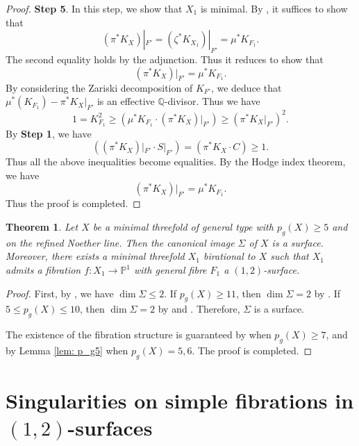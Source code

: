 \documentclass[a4paper,11pt]{amsart}
\newcommand{\PP}{\ensuremath{\mathbb{P}}}
\newcommand{\QQ}{\ensuremath{\mathbb{Q}}}
\newtheorem{thm}{Theorem}[section]
\theoremstyle{definition}
\theoremstyle{remark}
\numberwithin{equation}{section}
\begin{document}
\begin{proof}
	\textbf{Step 5}. In this step, we show that $X_1$ is minimal. By \cite[Lemma 3.2, (2) $\Leftrightarrow$ (3)]{CCJ}, it suffices to show that
	$$
	(\pi^*K_X)|_{F'} = (\zeta^*K_{X_1})|_{F'} = \mu^*K_{F_1}.
	$$
	The second equality holds by the adjunction. Thus it reduces to show that
	$$
	(\pi^*K_X)|_{F'} = \mu^*K_{F_1}.
	$$
    By considering the Zariski decomposition of $K_{F'}$, we deduce that $\mu^*(K_{F_1})-\pi^*K_X|_{F'}$ is an effective $\QQ$-divisor. Thus we have
    $$
    1 = K_{F_1}^2 \geq \left(\mu^*K_{F_1} \cdot (\pi^*K_X)|_{F'}\right) \geq (\pi^*K_X|_{F'})^2.
    $$
    By \textbf{Step 1}, we have
    $$
    \left( (\pi^*K_X)|_{F'}\cdot S|_{F'} \right) = (\pi^*K_X \cdot C) \geq 1. 
    $$
    Thus all the above inequalities become equalities. By the Hodge index theorem, we have 
    $$
    (\pi^*K_X)|_{F'} = \mu^*K_{F_1}.
    $$
    Thus the proof is completed.
\end{proof}

\begin{thm} \label{thm: existence of (1,2)-surface fibration}
   Let $X$ be a minimal threefold of general type with $p_g(X)\geq 5$ and on the refined Noether line. Then the canonical image $\Sigma$ of $X$ is a surface. Moreover, there exists a minimal threefold $X_1$ birational to $X$ such that $X_1$ admits a fibration $f: X_1 \to \PP^1$ with general fibre $F_1$ a $(1,2)$-surface. 
\end{thm}

\begin{proof}
    First, by \cite[Theorem 2.4]{Kobayashi}, we have $\dim \Sigma \leq 2$. If $p_g(X) \geq 11$, then $\dim \Sigma = 2$ by \cite[Proposition 4.6]{HZ}. If $5 \leq p_g(X) \leq 10$, then $\dim \Sigma=2$ by \cite[Theorem 4.4 and Theorem 4.5]{CCJ} and \cite[Theorem 4.6]{CHJ}. Therefore, $\Sigma$ is a surface.

    The existence of the fibration structure is guaranteed by \cite[Proposition 2.1]{HZ} when $p_g(X) \ge 7$, and by Lemma \ref{lem: p_g5} when $p_g(X) = 5, 6$. The proof is completed.    
\end{proof}


\section{Singularities on simple fibrations in \texorpdfstring{$(1, 2)$}{(1,2)}-surfaces}\label{appendix: sing}
\end{document}
